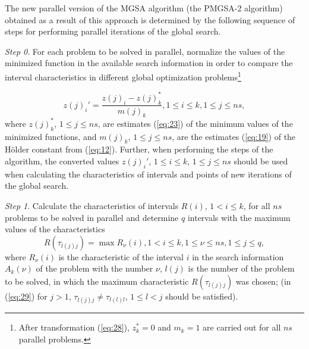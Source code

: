 \documentclass[review]{elsarticle}
\begin{document}
The new parallel version of the MGSA algorithm (the PMGSA-2 algorithm) obtained as a result of this approach is determined by the following sequence of steps for performing parallel iterations of the global search.

\textit{Step 0}. For each problem to be solved in parallel, normalize the values of the minimized function in the available search information in order to compare the interval characteristics in different global optimization problems\footnote{After transformation (\ref{eq:28}), $z_k^*=0$ and $m_k=1$ are carried out for all $ns$ parallel problems.}

\begin{equation}\label{eq:28}
z(j)_i'=\frac{z(j)_i-z(j)_k^*}{m(j)_k},1 \leq i \leq k,1 \leq j \leq ns,
\end{equation}
where $z(j)_k^*$, $1 \leq j \leq ns$, are estimates (\ref{eq:23}) of the minimum values of the minimized functions, and $m(j)_k$, $1 \leq j \leq ns$, are the estimates (\ref{eq:19}) of the H\"older constant from (\ref{eq:12}). Further, when performing the steps of the algorithm, the converted values $z(j)_i'$, $1 \leq i \leq k$, $1 \leq j \leq ns$ should be used when calculating the characteristics of intervals and points of new iterations of the global search.

\textit{Step 1}. Calculate the characteristics of intervals $R(i)$, $1 < i \leq k$, for all $ns$ problems to be solved in parallel and determine $q$ intervals with the maximum values of the characteristics
\begin{equation}\label{eq:29}
R(\tau_{l(j)j})=\max{R_\nu(i)}, 1 < i \leq k, 1 \leq \nu \leq ns, 1 \leq j \leq q,
\end{equation}
where $R_\nu(i)$ is the characteristic of the interval $i$ in the search information $A_k(\nu)$ of the problem with the number $\nu$, $l(j)$ is the number of the problem to be solved, in which the maximum characteristic $R(\tau_{l(j)j})$ was chosen; (in (\ref{eq:29}) for $j>1$, $\tau_{l(j)j}\neq \tau_{l(l)l}$, $1 \leq l < j$ should be satisfied).
\end{document}
